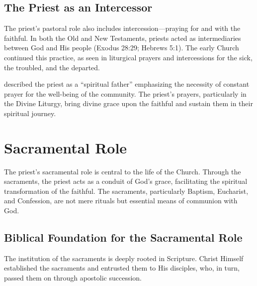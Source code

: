 \documentclass[12pt,doc]{apa7}   	%
\begin{document}
\subsection{The Priest as an Intercessor}

The priest’s pastoral role also includes intercession—praying for and with the faithful. In both the Old and New Testaments, priests acted as intermediaries between God and His people (Exodus 28:29; Hebrews 5:1). The early Church continued this practice, as seen in liturgical prayers and intercessions for the sick, the troubled, and the departed.

\citet{priests_zacharias} described the priest as a ``spiritual father'' emphasizing the necessity of constant prayer for the well-being of the community. The priest’s prayers, particularly in the Divine Liturgy, bring divine grace upon the faithful and sustain them in their spiritual journey.

\section{Sacramental Role}\label{sacramental}

The priest’s sacramental role is central to the life of the Church. Through the sacraments, the priest acts as a conduit of God’s grace, facilitating the spiritual transformation of the faithful. The sacraments, particularly Baptism, Eucharist, and Confession, are not mere rituals but essential means of communion with God.

\subsection{Biblical Foundation for the Sacramental Role}

The institution of the sacraments is deeply rooted in Scripture. Christ Himself established the sacraments and entrusted them to His disciples, who, in turn, passed them on through apostolic succession. 
\end{document}

